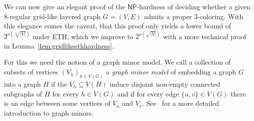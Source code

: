 \documentclass[10pt,a4paper]{article}
\numberwithin{equation}{section}
\theoremstyle{definition}
\newcommand{\NP}{\ensuremath{\mathsf{NP}}}
\begin{document}
We can now give an elegant proof of the $\NP$-hardness of deciding whether a given $8$-regular grid-like layered graph $G = (V, E)$ admits a proper $3$-coloring.
With this elegance comes the caveat, that this proof only yields a lower bound of $2^{o\left(\sqrt[4]{|V|}\right)}$ under ETH, which we improve to $2^{o\left(\sqrt{|V|}\right)}$ with a more technical proof in Lemma~\ref{lem:gridlikeethhardness}.

For this we need the notion of a graph minor model.
We call a collection of subsets of vertices $(V_h)_{h \in V(G)}$ a \emph{graph minor model} of embedding a graph $G$ into a graph $H$ if the $V_h \subseteq V(H)$ induce disjoint non-empty connected subgraphs of $H$ for every $h \in V(G)$ and if for every edge $\{u, v\} \in V(G)$ there is an edge between some vertices of $V_u$ and $V_v$.
See~\cite[Section 6.3]{cygan2015parameterized} for a more detailed introduction to graph minors.
\end{document}
